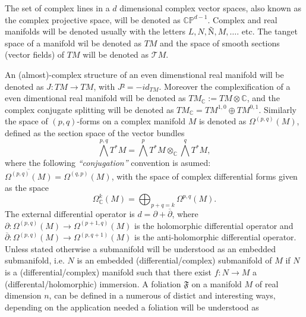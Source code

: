 \documentclass[12pt,twoside,a4paper]{report}
\newcommand{\co}{\ensuremath{\mathbb C }}
\newcommand{\cp}{\ensuremath{\mathbb{CP}}}
\begin{document}
The set of complex lines in a $d$ dimensional complex vector spaces, also known as the complex projective space, will be denoted as $\cp^{d-1}$. Complex and real manifolds will be denoted usually with the letters $L, N, Ñ, M,\dots$. etc. The tanget space of a manifold wil be denoted as $TM$ and the space of smooth sections (vector fields) of $TM$ will be denoted as $\mathcal{T}M$.

An (almost)-complex structure of an even dimenstional real manifold will be denoted as $J:TM\rightarrow TM$, with $J²=-id_{TM}$. Moreover the complexification of a even dimentional real manifold will be denoted as $TM_{\co}:=TM\otimes\co$, and the complex conjugate splitting will be denoted as $TM_{\co}=TM^{1,0}\oplus TM^{0,1}$.
Similarly the space of $(p,q)$-forms on a complex manifold $M$ is denoted as $\Omega^{(p,q)}(M)$, defined as the section space of the vector bundles
\[
  \bigwedge^{p,q}T^{*}M=\bigwedge^{p}T^{*}M\otimes_{\co}\bigwedge^{q}T^{*}M,
\]
\noindent where the following \emph{``conjugation''} convention is asumed: $\overline{\Omega^{(p,q)}(M)}=\Omega^{(q,p)}(M)$, with the space of complex differential forms given as the space
\[
  \Omega^{k}_{\co}(M)=\bigoplus_{p+q=k}\Omega^{p,q}(M).
\]
\noindent The external differential operator is $d=\partial + \overline{\partial}$, where $\partial:\Omega^{(p,q)}(M)\rightarrow \Omega^{(p+1,q)}(M)$ is the holomorphic differential operator and $\overline{\partial}:\Omega^{(p,q)}(M)\rightarrow\Omega^{(p,q+1)}(M)$ is the anti-holomorphic differential operator.\\
Unless stated otherwise a submanifold will be understood as an embedded submanifold, i.e. $N$ is an embedded (differential/complex) submanifold of $M$ if $N$ is a (differential/complex) manifold such that there exist $f:N\rightarrow M$ a (differental/holomorphic) immersion.
A foliation $\mathfrak{F}$ on a manifold $M$ of real dimension $n$, can be defined in a numerous of distict and interesting ways, depending on the application needed a foliation will be understood as
\end{document}
